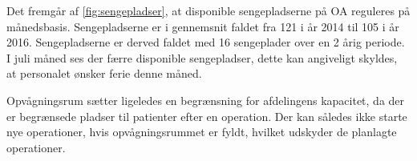 Det fremgår af \ref{fig:sengepladser}, at disponible sengepladserne på OA reguleres på månedsbasis. Sengepladserne er i gennemsnit faldet fra 121 i år 2014 til 105 i år 2016. Sengepladserne er derved faldet med 16 sengeplader over en 2 årig periode. I juli måned ses der færre disponible sengepladser, dette kan angiveligt skyldes, at personalet ønsker ferie denne måned. 

Opvågningsrum sætter ligeledes en begrænsning for afdelingens kapacitet, da der er begrænsede pladser til patienter efter en operation. Der kan således ikke starte nye operationer, hvis opvågningsrummet er fyldt, hvilket udskyder de planlagte operationer. 